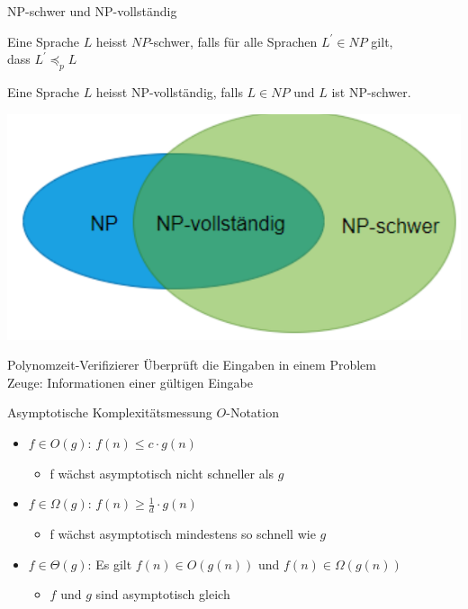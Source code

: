 \begin{concept}{NP-schwer und NP-vollständig}\\
    \begin{minipage}{0.6\linewidth}
        Eine Sprache $L$ heisst $N P$-schwer, falls für alle Sprachen $L^{\prime} \in N P$ gilt, \\dass $L^{\prime} \preccurlyeq_{p} L$
        
        Eine Sprache $L$ heisst NP-vollständig, falls $L \in N P$ und $L$ ist NP-schwer.
    \end{minipage}
    \begin{minipage}{0.38\linewidth}
        \includegraphics[width=1\linewidth]{p_vs_np.png}
    \end{minipage}
\end{concept}

\begin{definition}{Polynomzeit-Verifizierer}
    Überprüft die Eingaben in einem Problem\\
    Zeuge: Informationen einer gültigen Eingabe
\end{definition}

\begin{KR}{Asymptotische Komplexitätsmessung}
    $O$-Notation
    \begin{itemize}
        \item $f \in O(g)$: $f(n) \leq c \cdot g(n)$
        \begin{itemize}
            \item f wächst asymptotisch nicht schneller als $g$
        \end{itemize}
        \item $f \in \Omega(g)$: $f(n) \geq \frac{1}{d} \cdot g(n)$
        \begin{itemize}
            \item f wächst asymptotisch mindestens so schnell wie $g$
        \end{itemize}
        \item $f \in \Theta(g)$: Es gilt $f(n) \in O(g(n))$ und $f(n) \in \Omega(g(n))$
        \begin{itemize}
            \item $f$ und $g$ sind asymptotisch gleich
        \end{itemize}
    \end{itemize}
\end{KR}

